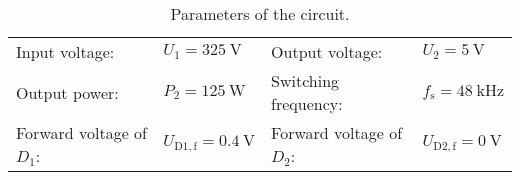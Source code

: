 
\begin{table}[ht]
    \centering  %
    \begin{tabular}{llll}
        \toprule
        Input voltage: &  $U_{\mathrm{1}} = \SI{325}{\volt}$ & Output voltage: & $U_{\mathrm{2}} = \SI{5}{\volt}$ \\ 
        Output power: & $P_{\mathrm{2}} = \SI{125}{\watt}$ & Switching frequency: & $f_{\mathrm{s}} = \SI{48}{\kilo\hertz}$ \\
        Forward voltage of $D_{\mathrm{1}}$: & $U_{\mathrm{D1,f}} = \SI{0.4}{\volt}$ & Forward voltage of $D_{\mathrm{2}}$: & $U_{\mathrm{D2,f}} = \SI{0}{\volt}$  \\
        \bottomrule
    \end{tabular}
    \caption{Parameters of the circuit.}  %
    \label{table:Ex04_Parameters of the singled ended forward converter.}
\end{table}